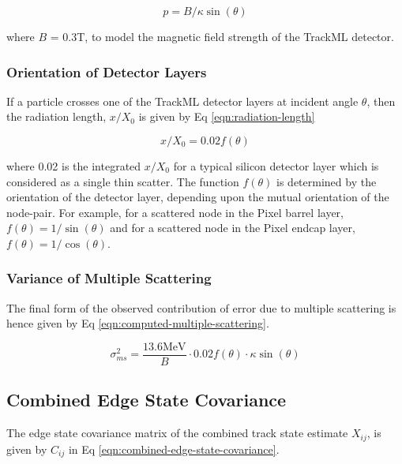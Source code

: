 \begin{equation}
p = B / \kappa \sin(\theta)
\label{eqn:full-momentum-derived}
\end{equation}

where $B$ = 0.3T, to model the magnetic field strength of the TrackML detector.

\subsubsection{Orientation of Detector Layers}

If a particle crosses one of the TrackML detector layers at incident angle $\theta$, then the radiation length, $x/X_0$ is given by Eq \eqref{eqn:radiation-length}

\begin{equation}
x/X_0 = 0.02 f(\theta)
\label{eqn:radiation-length}
\end{equation}

where 0.02 is the integrated $x/X_0$ for a typical silicon detector layer which is considered as a single thin scatter. The function $f(\theta)$ is determined by the orientation of the detector layer, depending upon the mutual orientation of the node-pair. For example, for a scattered node in the Pixel barrel layer, $f(\theta) = 1 / \sin(\theta)$ and for a scattered node in the Pixel endcap layer, $f(\theta) = 1 / \cos(\theta)$.




\subsubsection{Variance of Multiple Scattering}

The final form of the observed contribution of error due to multiple scattering is hence given by Eq \eqref{eqn:computed-multiple-scattering}.

\begin{equation}
    \sigma_{ms}^{2} = \frac{13.6 \text{MeV}}{B} \cdot 0.02 f(\theta) \cdot \kappa \sin(\theta)
    \label{eqn:computed-multiple-scattering}
\end{equation}



\subsection{Combined Edge State Covariance}

The edge state covariance matrix of the combined track state estimate $X_{ij}$, is given by $C_{ij}$ in Eq \eqref{eqn:combined-edge-state-covariance}.

